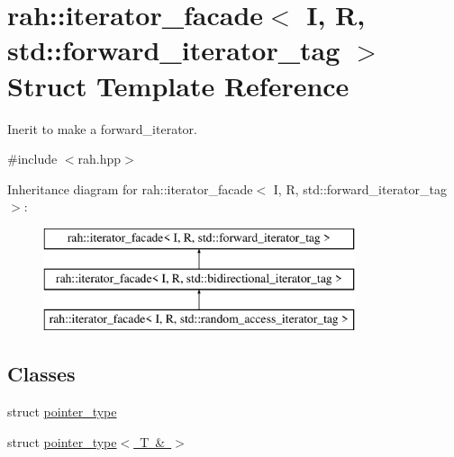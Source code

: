 \hypertarget{structrah_1_1iterator__facade_3_01_i_00_01_r_00_01std_1_1forward__iterator__tag_01_4}{}\section{rah\+::iterator\+\_\+facade$<$ I, R, std\+::forward\+\_\+iterator\+\_\+tag $>$ Struct Template Reference}
\label{structrah_1_1iterator__facade_3_01_i_00_01_r_00_01std_1_1forward__iterator__tag_01_4}


Inerit to make a forward\+\_\+iterator.  




{\ttfamily \#include $<$rah.\+hpp$>$}

Inheritance diagram for rah\+::iterator\+\_\+facade$<$ I, R, std\+::forward\+\_\+iterator\+\_\+tag $>$\+:\begin{figure}[H]
\begin{center}
\leavevmode
\includegraphics[height=3.000000cm]{structrah_1_1iterator__facade_3_01_i_00_01_r_00_01std_1_1forward__iterator__tag_01_4}
\end{center}
\end{figure}
\subsection*{Classes}
\begin{DoxyCompactItemize}
\item 
struct \mbox{\hyperlink{structrah_1_1iterator__facade_3_01_i_00_01_r_00_01std_1_1forward__iterator__tag_01_4_1_1pointer__type}{pointer\+\_\+type}}
\item 
struct \mbox{\hyperlink{structrah_1_1iterator__facade_3_01_i_00_01_r_00_01std_1_1forward__iterator__tag_01_4_1_1pointer__type_3_01_t_01_6_01_4}{pointer\+\_\+type$<$ T \& $>$}}
\end{DoxyCompactItemize}
